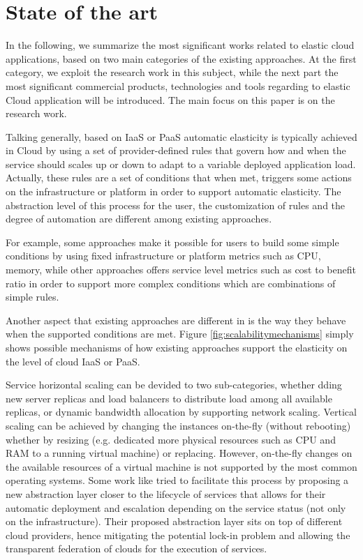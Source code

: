 \documentclass{sig-alternate}
\begin{document}
\section{State of the art}{\label{rw}
In the following, we summarize the most significant works related to elastic cloud applications, based on two main categories of the existing approaches.
At the first category, we exploit the research work in this subject, while the next part the most significant commercial products, technologies and tools regarding to elastic Cloud application will be introduced. The main focus on this paper is on the research work.

Talking generally, based on \cite{vaquero2011dynamically} IaaS or PaaS automatic elasticity is typically achieved in Cloud by using a set of provider-defined rules that govern how and when the service should scales up or down to adapt to a variable deployed application load. Actually, these rules are a set of conditions that when met, triggers some actions on the infrastructure or platform in order to support automatic elasticity. The abstraction level of this process for the user, the customization of rules and the degree of automation are different among existing approaches.

For example, some approaches make it possible for users to build some simple conditions by using fixed infrastructure or platform metrics such as CPU, memory, while other approaches offers service level metrics such as cost to benefit ratio in order to support more complex conditions which are combinations of simple rules.

Another aspect that existing approaches are different in is the way they behave when the supported conditions are met. Figure \ref{fig:scalabilitymechanisms}\cite{vaquero2011dynamically} simply shows possible mechanisms of how existing approaches support the elasticity on the level of cloud IaaS or PaaS.

Service horizontal scaling can be devided to two sub-categories, whether dding new server replicas and load balancers to distribute load among all available replicas, or dynamic bandwidth allocation by supporting network scaling. Vertical scaling can be achieved by changing the instances on-the-fly (without rebooting) whether by resizing (e.g. dedicated more physical resources such as CPU and RAM to a running virtual machine) or replacing. However, on-the-fly changes on the available resources of a virtual machine is not supported by the most common operating systems. Some work like \cite{rodero2010infrastructure} tried to facilitate this process by proposing a new abstraction layer closer to the lifecycle of services that allows for their automatic deployment and escalation depending on the service status (not only on the infrastructure). Their proposed abstraction layer sits on top of different cloud providers, hence mitigating the potential lock-in problem and allowing the transparent federation of clouds for the execution of services.

}
\end{document}
